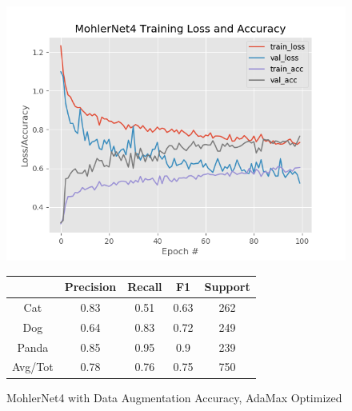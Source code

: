 \documentclass[12pt]{article}
\begin{document}
\begin{figure}[h]
	\centering %
	\captionsetup{justification=centering}
	\begin{minipage}{0.5\textwidth}
		\centering %
		\includegraphics[width=1\textwidth]{MohlerNet4_opt-Adamax.png}
		\caption{MohlerNet4 with Data Augmentation Accuracy, AdaMax Optimized} \label{MN4Augtanh}
	\end{minipage}\hfill
	\begin{minipage}{0.5\textwidth}
		\begin{center}
			\begin{tabular}[5pt]{| c| c| c| c|c|}
				\hline
				& Precision & Recall & F1 & Support \\[0.5ex] 
				\hline 	
				Cat   &    0.83&	0.51&	0.63&	262\\ \hline 
				Dog    &   0.64&	0.83&	0.72&	249   \\ \hline 
				Panda   &   0.85&	0.95&	0.9&	239   \\ \hline 
				Avg/Tot  &   0.78&	0.76&	0.75&	750\\ \hline 
				
			\end{tabular}
			\label{MN4RAugtanh}
		\end{center}	
	\end{minipage}
\end{figure}
\newpage
\end{document}
